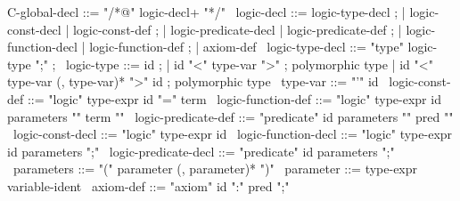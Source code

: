 \begin{syntax}
  C-global-decl ::= "/*@" logic-decl+ "*/"
  \
  logic-decl ::= logic-type-decl ;
          | logic-const-decl | logic-const-def ;
          | logic-predicate-decl | logic-predicate-def ;
          | logic-function-decl | logic-function-def ;
          | axiom-def
  \
  logic-type-decl ::= "type" logic-type ";" ; 
  \
  logic-type ::= id ;
  | id "<" type-var ">" ; polymorphic type
  | id "<" type-var (, type-var)* ">" id ; polymorphic type
  \
  type-var ::= "'" id 
  \
  logic-const-def ::= "logic" type-expr id "=" term
  \
  logic-function-def ::= "logic" type-expr id parameters "{" term "}"
  \
  logic-predicate-def ::= "predicate" id parameters "{" pred "}"
  \
  logic-const-decl ::= "logic" type-expr id 
  \
  logic-function-decl ::= "logic" type-expr id parameters ";"
  \
  logic-predicate-decl ::= "predicate" id parameters ";"
  \
  parameters ::= "(" parameter (, parameter)* ")"
  \
  parameter ::= type-expr variable-ident  
  \
  axiom-def ::= "axiom" id ":" pred ";"
\end{syntax}
